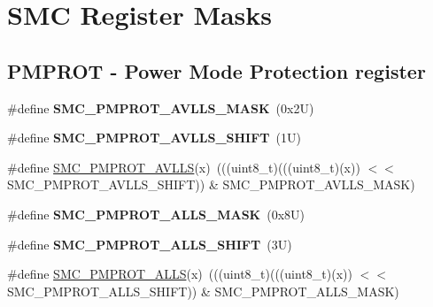 \hypertarget{group___s_m_c___register___masks}{}\section{S\+MC Register Masks}
\label{group___s_m_c___register___masks}
\subsection*{P\+M\+P\+R\+OT -\/ Power Mode Protection register}
\begin{DoxyCompactItemize}
\item 
\mbox{\label{group___s_m_c___register___masks_ga62e9f3c7e74a3e5b80b0fae8a896640d}} 
\#define {\bfseries S\+M\+C\+\_\+\+P\+M\+P\+R\+O\+T\+\_\+\+A\+V\+L\+L\+S\+\_\+\+M\+A\+SK}~(0x2\+U)
\item 
\mbox{\label{group___s_m_c___register___masks_gad625b387a627eb3a69f3a26edc0096b8}} 
\#define {\bfseries S\+M\+C\+\_\+\+P\+M\+P\+R\+O\+T\+\_\+\+A\+V\+L\+L\+S\+\_\+\+S\+H\+I\+FT}~(1\+U)
\item 
\#define \mbox{\hyperlink{group___s_m_c___register___masks_ga541d218a478588a9ea88a20e32dca00d}{S\+M\+C\+\_\+\+P\+M\+P\+R\+O\+T\+\_\+\+A\+V\+L\+LS}}(x)~(((uint8\+\_\+t)(((uint8\+\_\+t)(x)) $<$$<$ S\+M\+C\+\_\+\+P\+M\+P\+R\+O\+T\+\_\+\+A\+V\+L\+L\+S\+\_\+\+S\+H\+I\+FT)) \& S\+M\+C\+\_\+\+P\+M\+P\+R\+O\+T\+\_\+\+A\+V\+L\+L\+S\+\_\+\+M\+A\+SK)
\item 
\mbox{\label{group___s_m_c___register___masks_ga79d87e312be895d4f2bdfdda8c947600}} 
\#define {\bfseries S\+M\+C\+\_\+\+P\+M\+P\+R\+O\+T\+\_\+\+A\+L\+L\+S\+\_\+\+M\+A\+SK}~(0x8\+U)
\item 
\mbox{\label{group___s_m_c___register___masks_gac6cb1305b9cb329a8bb903036893db11}} 
\#define {\bfseries S\+M\+C\+\_\+\+P\+M\+P\+R\+O\+T\+\_\+\+A\+L\+L\+S\+\_\+\+S\+H\+I\+FT}~(3\+U)
\item 
\#define \mbox{\hyperlink{group___s_m_c___register___masks_ga94eb76615367d90d1cd865316a56120d}{S\+M\+C\+\_\+\+P\+M\+P\+R\+O\+T\+\_\+\+A\+L\+LS}}(x)~(((uint8\+\_\+t)(((uint8\+\_\+t)(x)) $<$$<$ S\+M\+C\+\_\+\+P\+M\+P\+R\+O\+T\+\_\+\+A\+L\+L\+S\+\_\+\+S\+H\+I\+FT)) \& S\+M\+C\+\_\+\+P\+M\+P\+R\+O\+T\+\_\+\+A\+L\+L\+S\+\_\+\+M\+A\+SK)

\end{DoxyCompactItemize}
